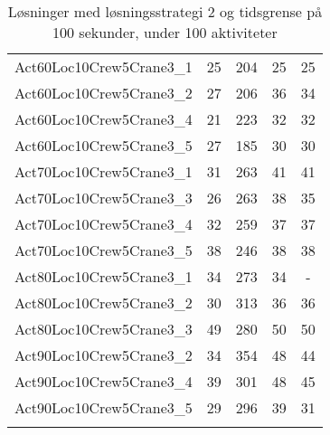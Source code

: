 \begin{center}
\begin{longtable}{ | l | c | c | c | c | }
Act60Loc10Crew5Crane3\_1	&	25	&	204	&	25	&	25	\\
Act60Loc10Crew5Crane3\_2	&	27	&	206	&	36	&	34	\\
Act60Loc10Crew5Crane3\_4	&	21	&	223	&	32	&	32	\\
Act60Loc10Crew5Crane3\_5	&	27	&	185	&	30	&	30	\\
Act70Loc10Crew5Crane3\_1	&	31	&	263	&	41	&	41	\\
Act70Loc10Crew5Crane3\_3	&	26	&	263	&	38	&	35	\\
Act70Loc10Crew5Crane3\_4	&	32	&	259	&	37	&	37	\\
Act70Loc10Crew5Crane3\_5	&	38	&	246	&	38	&	38	\\
Act80Loc10Crew5Crane3\_1	&	34	&	273	&	34	&	-	\\
Act80Loc10Crew5Crane3\_2	&	30	&	313	&	36	&	36	\\
Act80Loc10Crew5Crane3\_3	&	49	&	280	&	50	&	50	\\
Act90Loc10Crew5Crane3\_2	&	34	&	354	&	48	&	44	\\
Act90Loc10Crew5Crane3\_4	&	39	&	301	&	48	&	45	\\
Act90Loc10Crew5Crane3\_5	&	29	&	296	&	39	&	31	\\
\hline			
\caption{Løsninger med løsningsstrategi 2 og tidsgrense på 100 sekunder, under 100 aktiviteter}							
\label{tab:solutionSSTFAARF100s}								
\end{longtable}				
\end{center}

